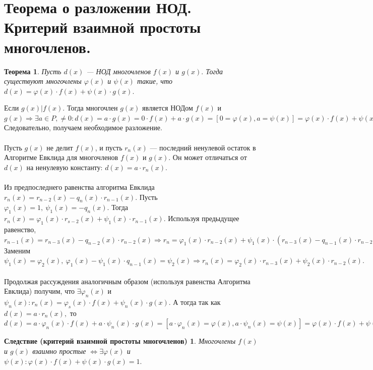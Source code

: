 \section{Теорема о разложении НОД. Критерий взаимной простоты многочленов.}
\newtheorem*{841}{Теорема}\begin{841}Пусть $d(x)$ --- НОД многочленов $f(x)$ и $g(x).$ Тогда существуют многочлены $\varphi(x)$ и $\psi (x)$ такие, что $d(x)=\varphi (x) \cdot f(x) + \psi (x) \cdot g(x).$ 
\end{841}
\begin{Proof}
	Если $g(x) | f(x)$. Тогда многочлен $g(x)$ является НОДом $f(x)$ и $g(x) \Rightarrow \exists a \in P, \ne 0: d(x)=a\cdot g(x)=0\cdot f(x)+a\cdot g(x)=[0= \varphi (x), a= \psi (x)]=\varphi (x) \cdot f(x) + \psi (x) \cdot  g (x).$ Следовательно, получаем необходимое разложение.\\\\
	Пусть $g(x)$ не делит $f(x)$, и пусть $r_n (x)$ --- последний ненулевой остаток в Алгоритме Евклида для многочленов $f(x)$ и $g(x)$. Он может отличаться от $d(x)$ на ненулевую константу: $d(x) = a\cdot r_n(x)$.\\\\
	Из предпоследнего равенства алгоритма Евклида $r_n (x) =r_{n-2} (x) - q_n (x)\cdot r_{n-1} (x).$ Пусть $\varphi_1 (x) = 1,\ \psi_1 (x)= -q_n(x).$ Тогда $r_n(x)= \varphi_1 (x)\cdot r_{s-2} (x) + \psi_1 (x) \cdot r_{n-1} (x).$ Используя предыдущее равенство, $r_{n-1} (x) = r_{n-3} (x) - q_{n-2} (x) \cdot r_{n-2} (x) \Rightarrow r_n=\varphi_1 (x) \cdot r_{n-2} (x) + \psi_1 (x) \cdot( r_{n-3} (x) - q_{n-1} (x) \cdot r_{n-2} (x))= \psi_1 (x) \cdot r_{n-3} (x) + (\varphi_1 (x) - \psi_1 (x) \cdot q_{n-1} (x)) \cdot r_{n-2} (x).$ Заменим $\psi_1 (x) = \varphi_2 (x),\ \varphi_1 (x) - \psi_1 (x) \cdot q_{n-1}(x)= \psi_2 (x) \Rightarrow r_n (x)= \varphi_2 (x) \cdot r_{n-3} (x) + \psi_2 (x)\cdot r_{n-2} (x).$\\\\
	Продолжая рассуждения аналогичным образом (используя равенства Алгоритма Евклида) получим, что
	$\exists \varphi_n(x)$ и $\psi_n(x): r_n(x)=\varphi_s(x)\cdot f(x)+\psi_n(x)\cdot g(x).$ А тогда так как $d(x)=a\cdot r_n(x),$ то $d(x)=a\cdot \varphi_n(x)\cdot f(x) + a\cdot \psi_n(x)\cdot g(x)=[a\cdot \varphi_n(x)=\varphi(x), a\cdot \psi_n(x)=\psi(x)]=\varphi(x)\cdot f(x)+\psi(x)\cdot g(x).$
\end{Proof}
\newtheorem*{842}{Следствие (критерий взаимной простоты многочленов)} 
\begin{842} 
	Многочлены $f(x)$ и $g(x)$ взаимно простые $\Longleftrightarrow \exists \varphi(x)$ и $\psi(x): \varphi(x)\cdot f(x) + \psi(x)\cdot g(x) = 1.$
\end{842}
